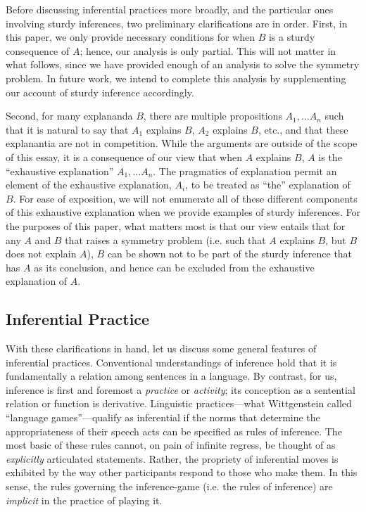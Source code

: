 \documentclass{article}                     %
\newcounter{fncntr}
\newcommand{\fnmark}[1]{\refstepcounter{fncntr}\label{#1}\footnotemark[\getrefnumber{#1}]}
\begin{document}
Before discussing inferential practices more broadly, and the particular ones involving sturdy inferences, two preliminary clarifications are in order. First,  in this paper, we only provide necessary conditions for when $B$ is a sturdy consequence of $A$; hence, our analysis is only partial. This will not matter in what follows, since we have provided enough of an analysis to solve the symmetry problem. In future work, we intend to complete this analysis by supplementing our account of sturdy inference accordingly. 

Second, for many explananda $B$, there are multiple propositions $A_1, \ldots A_n$­ such that it is natural to say that $A_1$ explains $B$, $A_2$ explains $B$, etc., and that these explanantia are not in competition. While the arguments are outside of the scope of this essay, it is a consequence of our view that when $A$ explains $B$, $A$ is the ``exhaustive explanation'' $A_1, \ldots A_n$.  The pragmatics of explanation permit an element of the exhaustive explanation, $A_i$, to be treated as ``the'' explanation of $B$. For ease of exposition, we will not enumerate all of these different components of this exhaustive explanation when we provide examples of sturdy inferences. For the purposes of this paper, what matters most is that our view entails that for any $A$ and $B$ that raises a symmetry problem (i.e. such that $A$ explains $B$, but $B$ does not explain $A$), $B$ can be shown not to be part of the sturdy inference that has $A$ as its conclusion, and hence can be excluded from the exhaustive explanation of $A$.

\subsection{Inferential Practice} \label{subsec:Material}

With these clarifications in hand, let us discuss some general features of inferential practices. Conventional understandings of inference hold that it is fundamentally a relation among sentences in a language. By contrast, for us, inference is first and foremost a \textit{practice} or \textit{activity}; its conception as a sentential relation or function is derivative. Linguistic practices---what Wittgenstein called ``language games''---qualify as inferential if the norms that determine the appropriateness of their speech acts can be specified as rules of inference. The most basic of these rules cannot, on pain of infinite regress, be thought of as \textit{explicitly} articulated statements. Rather, the propriety of inferential moves is exhibited by the way other participants respond to those who make them. In this sense, the rules governing the inference-game (i.e. the rules of inference) are \textit{implicit} in the practice of playing it.\fnmark{Inferentialism}
\end{document}
